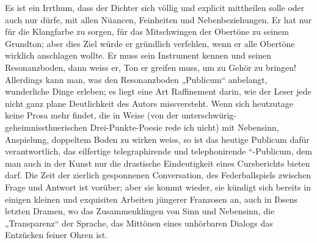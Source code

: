 Es ist ein Irrthum, dass der Dichter sich völlig und explicit mittheilen solle oder auch nur dürfe, mit allen Nüancen, Feinheiten und Nebenbeziehungen. Er hat nur für die Klangfarbe zu sorgen, für das Mitschwingen der Obertöne zu seinem Grundton; aber dies Ziel würde er gründlich verfehlen, wenn er alle Obertöne wirklich anschlagen wollte. Er muss sein Instrument kennen und seinen Resonanzboden, dann weiss er, Ton er greifen muss, um  zu Gehör zu bringen! Allerdings kann man, was den Resonanzboden „Publicum“ anbelangt, wunderliche Dinge erleben; es liegt eine Art Raffinement darin, wie der Leser jede nicht ganz plane Deutlichkeit des Autors missversteht. Wenn sich heutzutage keine Prosa mehr findet, die in  Weise (von der unterschwürig-geheimnissthuerischen Drei-Punkte-Poesie rede ich nicht) mit Nebensinn, Anspielung, doppeltem Boden zu wirken weiss, so ist das heutige Publicum dafür verantwortlich, das eilfertige telegraphirende und telephonirende “-Publicum, dem man auch in der Kunst nur die drastische Eindeutigkeit eines Cursberichts bieten darf. Die Zeit der zierlich gesponnenen Conversation, des Federballspiels zwischen Frage und Antwort ist vorüber; aber sie kommt wieder, sie kündigt sich bereits in einigen kleinen und exquisiten Arbeiten jüngerer Franzosen an, auch in Ibsens letzten Dramen, wo das Zusammenklingen von Sinn und Nebensinn, die „Transparenz“ der Sprache, das Mittönen eines unhörbaren Dialogs das Entzücken feiner Ohren ist.
\par

